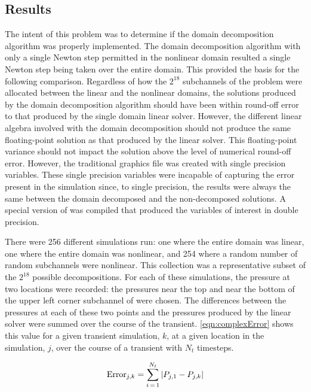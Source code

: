 \subsection{Results}
\label{sect:complexResults}

The intent of this problem was to determine if the domain decomposition algorithm was properly implemented.
The domain decomposition algorithm with only a single Newton step permitted in the nonlinear domain resulted a single Newton step being taken over the entire domain.
This provided the basis for the following comparison.
Regardless of how the $2^{18}$ subchannels of the problem were allocated between the linear and the nonlinear domains, the solutions produced by the domain decomposition algorithm should have been within round-off error to that produced by the single domain linear solver.
However, the different linear algebra involved with the domain decomposition should not produce the same floating-point solution as that produced by the linear solver.
This floating-point variance should not impact the solution above the level of numerical round-off error.
However, the traditional \cobra{} graphics file was created with single precision variables.
These single precision variables were incapable of capturing the error present in the simulation since, to single precision, the results were always the same between the domain decomposed and the non-decomposed solutions.
A special version of \cobra{} was compiled that produced the variables of interest in double precision.

There were 256 different simulations run: one where the entire domain was linear, one where the entire domain was nonlinear, and 254 where a random number of random subchannels were nonlinear.
This collection was a representative subset of the $2^{18}$ possible decompositions.
For each of these simulations, the pressure at two locations were recorded: the pressures near the top and near the bottom of the upper left corner subchannel of  were chosen.
The differences between the pressures at each of these two points and the pressures produced by the linear solver were summed over the course of the transient.
\eqref{eqn:complexError} shows this value for a given transient simulation, $k$, at a given location in the simulation, $j$, over the course of a transient with $N_{t}$ timesteps.

\begin{equation}
\label{eqn:complexError}
\text{Error}_{j, k} = \sum_{i\,=\,1}^{N_{t}} \left|P_{j,1} -P_{j, k}\right|
\end{equation}

